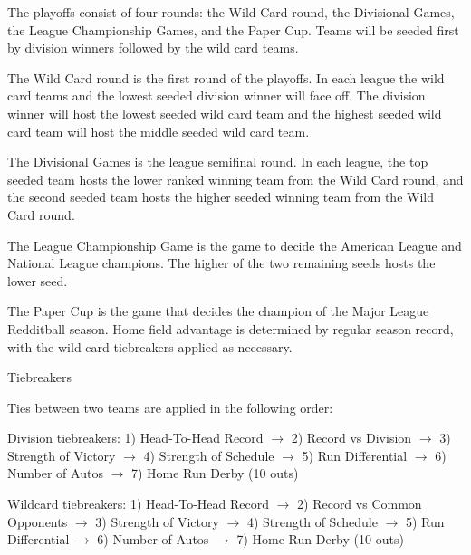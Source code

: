 \begin{deepEnumerate}
\begin{deepEnumerate}
\begin{deepEnumerate}
			\item The playoffs consist of four rounds:
			the Wild Card round, the Divisional Games, the League Championship Games, and the Paper Cup.
			Teams will be seeded first by division winners followed by the wild card teams.
			\begin{deepEnumerate}
				\item The Wild Card round is the first round of the playoffs. 
				In each league the wild card teams and the lowest seeded division winner will face off. 
				The division winner will host the lowest seeded wild card team 
				and the highest seeded wild card team will host the middle seeded wild card team.
				\item The Divisional Games is the league semifinal round. 
				In each league, the top seeded team hosts the lower ranked winning team from the Wild Card round, 
				and the second seeded team hosts the higher seeded winning team from the Wild Card round.
				\item The League Championship Game is the game to decide the American League and National League champions. 
				The higher of the two remaining seeds hosts the lower seed.
				\item The Paper Cup is the game that decides the champion of the Major League Redditball season. 
				Home field advantage is determined by regular season record, 
				with the wild card tiebreakers applied as necessary.
			\end{deepEnumerate}
			\item Tiebreakers
			\begin{deepEnumerate}
				\item Ties between two teams are applied in the following order:
				\begin{deepEnumerate}
					\item Division tiebreakers: 
					1) Head-To-Head Record $\rightarrow$  
					2) Record vs Division $\rightarrow$ 
					3) Strength of Victory $\rightarrow$ 
					4) Strength of Schedule $\rightarrow$ 
					5) Run Differential $\rightarrow$  
					6) Number of Autos $\rightarrow$ 
					7) Home Run Derby (10 outs)
					\item Wildcard tiebreakers: 
					1) Head-To-Head Record $\rightarrow$  
					2) Record vs Common Opponents $\rightarrow$ 
					3) Strength of Victory $\rightarrow$ 
					4) Strength of Schedule $\rightarrow$ 
					5) Run Differential $\rightarrow$  
					6) Number of Autos $\rightarrow$  
					7) Home Run Derby (10 outs)
				\end{deepEnumerate}

\end{deepEnumerate}
\end{deepEnumerate}
\end{deepEnumerate}
\end{deepEnumerate}
